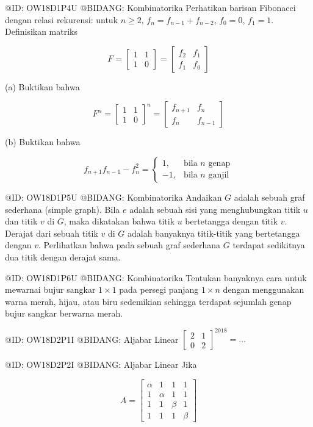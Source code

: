 @ID: OW18D1P4U
@BIDANG: Kombinatorika
Perhatikan barisan Fibonacci dengan relasi rekurensi: untuk $n \ge 2$, $f_n = f_{n-1} + f_{n-2}$, $f_0 = 0$, $f_1 = 1$. Definisikan matriks 

$$
F = \begin{bmatrix} 1 & 1 \\ 1 & 0 \end{bmatrix} = \begin{bmatrix} f_2 & f_1 \\ f_1 & f_0 \end{bmatrix}
$$

(a) Buktikan bahwa 

$$
F^n = \begin{bmatrix} 1 & 1 \\ 1 & 0 \end{bmatrix}^n = \begin{bmatrix} f_{n+1} & f_n \\ f_n & f_{n-1} \end{bmatrix}
$$

(b) Buktikan bahwa 

$$
f_{n+1}f_{n-1} - f_n^2 = \begin{cases} 1, & \text{bila } n \text{ genap} \\ -1, & \text{bila } n \text{ ganjil} \end{cases}
$$

@ID: OW18D1P5U
@BIDANG: Kombinatorika
Andaikan $G$ adalah sebuah graf sederhana (simple graph). Bila $e$ adalah sebuah sisi yang menghubungkan titik $u$ dan titik $v$ di $G$, maka dikatakan bahwa titik $u$ bertetangga dengan titik $v$. Derajat dari sebuah titik $v$ di $G$ adalah banyaknya titik-titik yang bertetangga dengan $v$. Perlihatkan bahwa pada sebuah graf sederhana $G$ terdapat sedikitnya dua titik dengan derajat sama.

@ID: OW18D1P6U
@BIDANG: Kombinatorika
Tentukan banyaknya cara untuk mewarnai bujur sangkar $1 \times 1$ pada persegi panjang $1 \times n$ dengan menggunakan warna merah, hijau, atau biru sedemikian sehingga terdapat sejumlah genap bujur sangkar berwarna merah.

@ID: OW18D2P1I
@BIDANG: Aljabar Linear
$\begin{bmatrix} 2 & 1 \\ 0 & 2 \end{bmatrix}^{2018} = \dots$

@ID: OW18D2P2I
@BIDANG: Aljabar Linear
Jika 

$$
A = \begin{bmatrix} \alpha & 1 & 1 & 1 \\ 1 & \alpha & 1 & 1 \\ 1 & 1 & \beta & 1 \\ 1 & 1 & 1 & \beta \end{bmatrix}
$$

